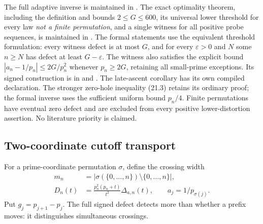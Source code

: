 \documentclass[11pt]{article}
\theoremstyle{definition}
\begin{document}
\begin{sloppypar}
The full adaptive inverse is maintained in
. The exact optimality theorem,
including the definition and bounds $2\le G\le600$, its universal lower
threshold for every law \emph{not a finite permutation}, and a single
witness for all positive probe sequences, is maintained in
. The formal statements use
the equivalent threshold formulation: every witness defect is at most
$G$, and for every $\varepsilon>0$ and $N$ some $n\ge N$ has defect
at least $G-\varepsilon$. The witness also satisfies the explicit bound
$|a_n-1/p_n|\le2G/p_n^2$ whenever $p_n\ge2G$, retaining all small-prime
exceptions. Its signed construction is in
 and
.
The late-ascent corollary has its own compiled declaration. The stronger
zero-hole inequality (21.3) retains its ordinary proof; the formal
inverse uses the sufficient uniform bound $p_n/4$. Finite permutations
have eventual zero defect and are excluded from every positive
lower-distortion assertion. No literature priority is claimed.
\end{sloppypar}

\subsection{Two-coordinate cutoff transport}

For a prime-coordinate permutation $\sigma$, define the crossing width
\begin{align*}
 m_n&=\bigl|\sigma(\{0,\ldots,n\})\setminus\{0,\ldots,n\}\bigr|,\\
 D_n(t)&=\frac{p_n^2(p_n+t)}{t^2}\Delta_{a,n}(t),
 \qquad a_j=1/p_{\sigma(j)}.
\end{align*}
Put $g_j=p_{j+1}-p_j$. The full signed defect detects more than whether
a prefix moves: it distinguishes simultaneous crossings.
\end{document}
